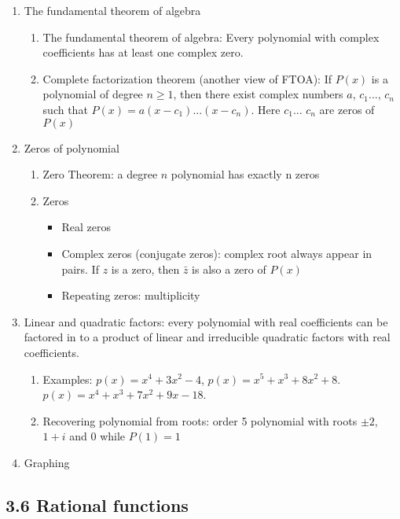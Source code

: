 \documentclass{article}
\begin{document}
\begin{enumerate}
\item The fundamental theorem of algebra 
\begin{enumerate}
\item The fundamental theorem of algebra: Every polynomial with complex coefficients has at least one complex zero.
\item Complete factorization theorem (another view of FTOA): If $P(x)$ is a polynomial of degree $n\geq 1$, then there exist complex numbers $a$, $c_1...$, $c_n$ such that $P(x)= a(x-c_1)...(x-c_n)$. Here $c_1$... $c_n$ are zeros of $P(x)$
\end{enumerate}

\item Zeros of polynomial
\begin{enumerate}
\item Zero Theorem: a degree $n$ polynomial has exactly n zeros
\item Zeros
\begin{itemize}
\item Real zeros
\item Complex zeros (conjugate zeros): complex root always appear in pairs. If $z$ is a zero, then $\bar z$ is also a zero of $P(x)$
\item Repeating zeros: multiplicity
\end{itemize}
\end{enumerate}

\item Linear and quadratic factors: every polynomial with real coefficients can be factored in to a product of linear and irreducible quadratic factors with real coefficients.
\begin{enumerate}
\item Examples: $p(x) = x^4+3x^2-4$, $p(x) = x^5+x^3+8x^2+8$. $p(x)=x^4+x^3+7x^2+9x-18$. 
\item Recovering polynomial from roots: order 5 polynomial with roots $\pm 2$, $1+i$ and $0$ while $P(1) = 1$
\end{enumerate}

\item Graphing
\end{enumerate}


\subsection{3.6 Rational functions}
\end{document}

